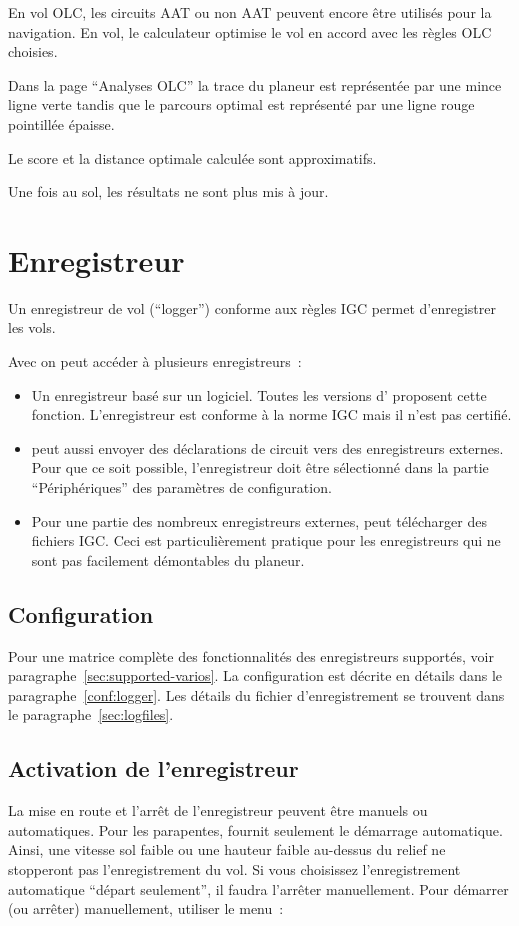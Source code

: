 En vol OLC, les circuits AAT ou non AAT peuvent encore être utilisés pour la navigation. En vol, le calculateur optimise le vol en accord avec les règles OLC choisies.

Dans la page ``Analyses OLC'' la trace du planeur est représentée par une mince ligne verte tandis que le parcours optimal est représenté par une ligne rouge pointillée épaisse.

Le score et la distance optimale calculée sont approximatifs.

Une fois au sol, les résultats ne sont plus mis à jour.


\section{Enregistreur}\label{sec:logger}

Un enregistreur de vol (``logger'') conforme aux règles IGC permet d'enregistrer les vols.

Avec \xc{} on peut accéder à plusieurs enregistreurs~:
\begin{itemize}
\item Un enregistreur basé sur un logiciel. Toutes les versions d'\xc{} proposent cette fonction. L'enregistreur est conforme à la norme IGC mais il n'est pas certifié.
\item \xc{} peut aussi envoyer des déclarations de circuit vers des enregistreurs externes.
Pour que ce soit possible, l'enregistreur doit être sélectionné dans la partie ``Périphériques'' des paramètres de  configuration.
\item  Pour une partie des nombreux enregistreurs externes, \xc{} peut télécharger des fichiers IGC.\@
Ceci est particulièrement pratique pour les enregistreurs qui ne sont pas facilement démontables du planeur.
\end{itemize}

\subsection*{Configuration}
Pour une matrice complète des fonctionnalités des enregistreurs supportés, voir paragraphe~\ref{sec:supported-varios}.
La configuration est décrite en détails dans le paragraphe~\ref{conf:logger}. Les détails du fichier d'enregistrement se trouvent dans le paragraphe~\ref{sec:logfiles}.

\subsection*{Activation de l'enregistreur}
La mise en route et l'arrêt de l'enregistreur peuvent être manuels ou automatiques. Pour les parapentes,
\xc{} fournit seulement le démarrage automatique. Ainsi, une vitesse
sol faible ou une hauteur faible au-dessus du relief ne stopperont pas l'enregistrement du vol.
Si vous choisissez l'enregistrement automatique ``départ seulement'', il faudra l'arrêter manuellement.
Pour démarrer (ou arrêter) manuellement, utiliser le menu~:
\begin{quote}
\blink{}
\end{quote}

